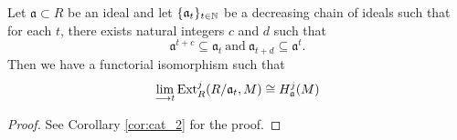 \documentclass[11pt, a4paper, twoside]{article}
\begin{document}
\begin{cor}\label{cor:cofinal_systems}
    Let $\mathfrak{a}\subset R$ be an ideal and let $\{\mathfrak{a}_t\}_{t\in\mathbb{N}}$ be a decreasing chain of ideals such that for each $t$, there exists natural integers $c$ and $d$ such that 
    \begin{displaymath}
        \mathfrak{a}^{t+c}\subseteq\mathfrak{a}_t\ \mathrm{and}\ \mathfrak{a}_{t+d}\subseteq\mathfrak{a}^t.
    \end{displaymath}
    Then we have a functorial isomorphism such that
    \begin{displaymath}
        \lim\limits_{\longrightarrow t}\operatorname{Ext}^j_R(R/\mathfrak{a}_t,M)\cong H_{\mathfrak{a}}^j(M)
    \end{displaymath}
\end{cor}
\begin{proof}
    See Corollary \ref{cor:cat_2} for the proof.
\end{proof}

	
\end{document}
